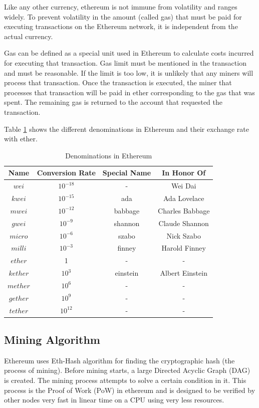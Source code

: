 \documentclass[11pt,openright]{report}
\begin{document}
Like any other currency, ethereum is not immune from volatility and ranges widely. To prevent volatility in the amount (called gas) that must be paid for executing transactions on the Ethereum network, it is independent from the actual currency. 

Gas can be defined as a special unit used in Ethereum to calculate costs incurred for executing that transaction. Gas limit must be mentioned in the transaction and must be reasonable. If the limit is too low, it is unlikely that any miners will process that transaction. Once the transaction is executed, the miner that processes that transaction will be paid in ether corresponding to the gas that was spent. The remaining gas is returned to the account that requested the transaction.

Table \ref{eth_denominations} shows the different denominations in Ethereum and their exchange rate with ether.

\begin{table}[!htbp]
	\renewcommand{\arraystretch}{1.3}
	\caption{Denominations in Ethereum}
	\label{eth_denominations}
	\centering
	\begin{tabular}{|c||c|c|c|}
		\hline
		\bfseries Name & \bfseries Conversion Rate & \bfseries Special Name & \bfseries In Honor Of\\
		\hline\hline
		$wei$ & $10^{-18}$ & - & Wei Dai \\ \hline
	    $kwei$ & $10^{-15}$ & ada & Ada Lovelace \\ \hline
	    $mwei$ & $10^{-12}$ & babbage & Charles Babbage \\ \hline
	    $gwei$ & $10^{-9}$ & shannon & Claude Shannon \\ \hline
	    $micro$ & $10^{-6}$ & szabo & Nick Szabo \\ \hline
	    $milli$ & $10^{-3}$ & finney & Harold Finney \\ \hline
	    $ether$ & 1 & - & - \\ \hline
	    $kether$ & $10^{3}$ & einstein & Albert Einstein \\ \hline
	    $mether$ & $10^{6}$ & - & - \\ \hline
	    $gether$ & $10^{9}$ & - & - \\ \hline
	    $tether$ & $10^{12}$ & - & - \\ \hline
	\end{tabular}
\end{table}

\subsection{Mining Algorithm}
Ethereum uses Eth-Hash algorithm \cite{wood2014yellow} for finding the cryptographic hash (the process of mining). Before mining starts, a large Directed Acyclic Graph (DAG) is created. The mining process attempts to solve a certain condition in it. This process is the Proof of Work (PoW) in ethereum and is designed to be verified by other nodes very fast in linear time on a CPU using very less resources.
\end{document}
